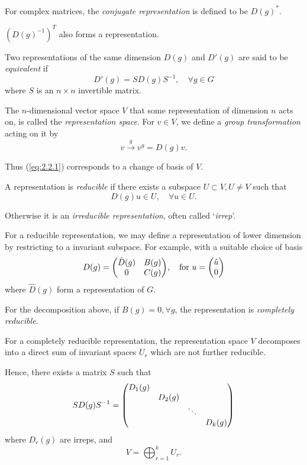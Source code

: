 \documentclass[a4paper,11pt]{article}
\begin{document}
	For complex matrices, the \emph{conjugate representation} is defined to be $D(g)^*$.

	\begin{nt}
		$(D(g)^{-1})^T$ also forms a representation. 
	\end{nt}

	\begin{defi}
		Two representations of the same dimension $D(g)$ and $D'(g)$ are said to be \emph{equivalent} if 
		\begin{equation}
			D'(g) = S D(g) S^{-1}, \quad \forall g \in G
			\label{eq:2.2.1}
		\end{equation}
		where $S$ is an $n\times n$ invertible matrix.
	\end{defi}

	\begin{defi}
		The $n$-dimensional vector space $V$ that some representation of dimension $n$ acts on, is called the \emph{representation space}. For $v \in V$, we define a \emph{group transformation} acting on it by
		\[
			v \xrightarrow{g} v^g = D(g) v.
		\]
		
	\end{defi}

	\begin{nt}
		Thus (\ref{eq:2.2.1}) corresponds to a change of basis of $V$.
	\end{nt}

	\begin{defi}
		A representation is \emph{reducible} if there exists a subspace $U \subset V, U \neq V$ such that
		\[
			D(g) u \in U, \quad \forall u \in U.
		\]
		
		Otherwise it is an \emph{irreducible representation}, often called `\emph{irrep}'.
	\end{defi}

	For a reducible representation, we may define a representation of lower dimension by restricting to a invariant subspace. For example, with a suitable choice of basis 
	\[
		D(g) = \mqty(\hat{D}(g) & B(g)\\ 0 & C(g)), \quad \text{for } u = \mqty(\hat{u}\\0)
	\]
	where $\hat{D}(g)$ form a representation of $G$.

	\begin{defi}
		For the decomposition above, if $B(g) = 0, \forall g$, the representation is \emph{completely reducible}.
	\end{defi}

	\begin{cor}
		For a completely reducible representation, the representation space $V$ decomposes into a direct sum of invariant spaces $U_r$ which are not further reducible.

		Hence, there exists a matrix $S$ such that
		\[
			S D(g) S^{-1} = \mqty(\dmat{D_1(g), D_2(g), \ddots, D_k(g)})
		\]
		where $D_r(g)$ are irreps, and 
		\[
			V = \bigoplus_{r=1}^k U_r.
		\]
	\end{cor}
\end{document}
